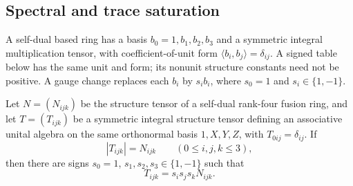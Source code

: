 \subsection{Spectral and trace saturation}


A self-dual based ring has a basis $b_0=1,b_1,b_2,b_3$ and a symmetric
integral multiplication tensor, with coefficient-of-unit form
$\langle b_i,b_j\rangle=\delta_{ij}$. A signed table below has the same
unit and form; its nonunit structure constants need not be positive.
A gauge change replaces each $b_i$ by $s_i b_i$, where $s_0=1$ and
$s_i\in\{1,-1\}$.



\begin{lemma}\label{trace:lem:absolute-rigidity}
Let $N=(N_{ijk})$ be the structure tensor of a self-dual rank-four fusion ring, and let $T=(T_{ijk})$ be a symmetric integral structure tensor defining an associative unital algebra on the same orthonormal basis $1,X,Y,Z$, with $T_{0ij}=\delta_{ij}$. If
\[
|T_{ijk}|=N_{ijk}\qquad(0\le i,j,k\le3),
\]
then there are signs $s_0=1$, $s_1,s_2,s_3\in\{1,-1\}$ such that
\[
T_{ijk}=s_i s_j s_k N_{ijk}.
\]
\end{lemma}
